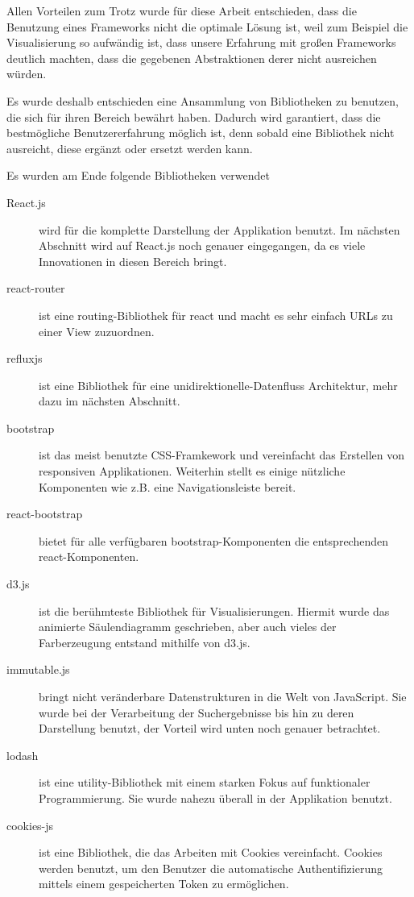 \documentclass[12pt,twoside]{book}
\begin{document}
Allen Vorteilen zum Trotz wurde für diese Arbeit entschieden, dass die Benutzung eines Frameworks nicht die optimale Lösung ist, weil zum Beispiel die Visualisierung so aufwändig ist, dass unsere Erfahrung mit großen Frameworks deutlich machten, dass die gegebenen Abstraktionen derer nicht ausreichen würden.

Es wurde deshalb entschieden eine Ansammlung von Bibliotheken zu benutzen, die sich für ihren Bereich bewährt haben. Dadurch wird garantiert, dass die bestmögliche Benutzererfahrung möglich ist, denn sobald eine Bibliothek nicht ausreicht, diese ergänzt oder ersetzt werden kann.

Es wurden am Ende folgende Bibliotheken verwendet

\begin{description}
	\item[React.js \cite{react}] wird für die komplette Darstellung der Applikation benutzt. Im nächsten Abschnitt wird auf React.js noch genauer eingegangen, da es viele Innovationen in diesen Bereich bringt.
	\item[react-router \cite{reactrouter}] ist eine routing-Bibliothek für react und macht es sehr einfach URLs zu einer View zuzuordnen.
	\item[refluxjs \cite{reflux}] ist eine Bibliothek für eine unidirektionelle-Datenfluss Architektur, mehr dazu im nächsten Abschnitt.
	\item[bootstrap \cite{bootstrap}] ist das meist benutzte CSS-Framkework und vereinfacht das Erstellen von responsiven Applikationen. Weiterhin stellt es einige nützliche Komponenten wie z.B. eine Navigationsleiste bereit.
	\item[react-bootstrap \cite{reactrouter}] bietet für alle verfügbaren bootstrap-Komponenten die entsprechenden react-Komponenten.
	\item[d3.js \cite{bostock2011d3}] ist die berühmteste Bibliothek für Visualisierungen. Hiermit wurde das animierte Säulendiagramm geschrieben, aber auch vieles der Farberzeugung entstand mithilfe von d3.js.
	\item[immutable.js \cite{Immutable}] bringt nicht veränderbare Datenstrukturen in die Welt von JavaScript. Sie wurde bei der Verarbeitung der Suchergebnisse bis hin zu deren Darstellung benutzt, der Vorteil wird unten noch genauer betrachtet.
	\item[lodash \cite{underscore}] ist eine utility-Bibliothek mit einem starken Fokus auf funktionaler Programmierung. Sie wurde nahezu überall in der Applikation benutzt.
	\item[cookies-js \cite{cookiesjs}] ist eine Bibliothek, die das Arbeiten mit Cookies vereinfacht. Cookies werden benutzt, um den Benutzer die automatische Authentifizierung mittels einem gespeicherten Token zu ermöglichen.

\end{description}
\end{document}
